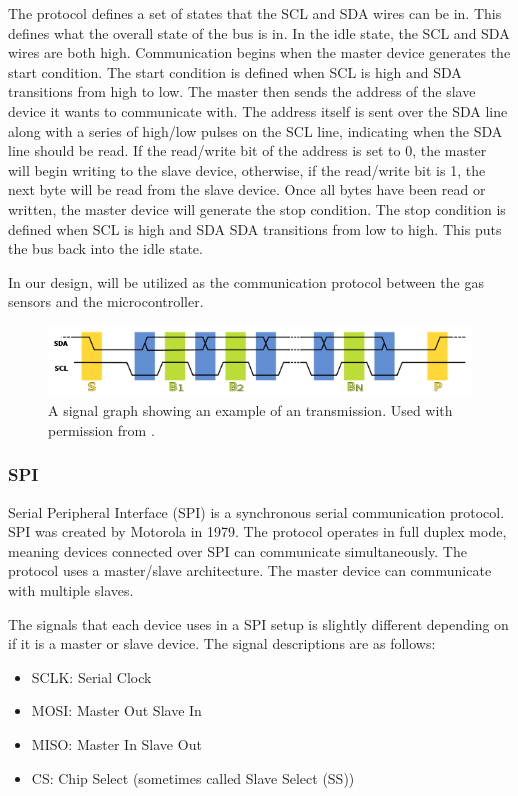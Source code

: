 The \iic protocol defines a set of states that the SCL and SDA wires can be in. This defines what the overall state of the \iic bus is in. In the idle state, the SCL and SDA wires are both high. Communication begins when the master device generates the start condition. The start condition is defined when SCL is high and SDA transitions from high to low. The master then sends the address of the slave device it wants to communicate with. The address itself is sent over the SDA line along with a series of high/low pulses on the SCL line, indicating when the SDA line should be read. If the read/write bit of the address is set to 0, the master will begin writing to the slave device, otherwise, if the read/write bit is 1, the next byte will be read from the slave device. Once all bytes have been read or written, the master device will generate the stop condition. The stop condition is defined when SCL is high and SDA SDA transitions from low to high. This puts the bus back into the idle state.

In our design, \iic will be utilized as the communication protocol between the gas sensors and the microcontroller.

\begin{figure}
    \centering
    \includegraphics[width=6in]{figures/i2c-protocol.png}
    \caption{A signal graph showing an example of an \iic transmission. Used with permission from \cite{i2c-protocol}.}
    \label{fig:uart-data-packet}
\end{figure}

\subsubsection{SPI}
Serial Peripheral Interface (SPI) is a synchronous serial communication protocol. SPI was created by Motorola in 1979. The protocol operates in full duplex mode, meaning devices connected over SPI can communicate simultaneously. The protocol uses a master/slave architecture. The master device can communicate with multiple slaves.

The signals that each device uses in a SPI setup is slightly different depending on if it is a master or slave device. The signal descriptions are as follows:
\begin{itemize}
    \item SCLK: Serial Clock
    \item MOSI: Master Out Slave In
    \item MISO: Master In Slave Out
    \item CS: Chip Select (sometimes called Slave Select (SS))
\end{itemize}

